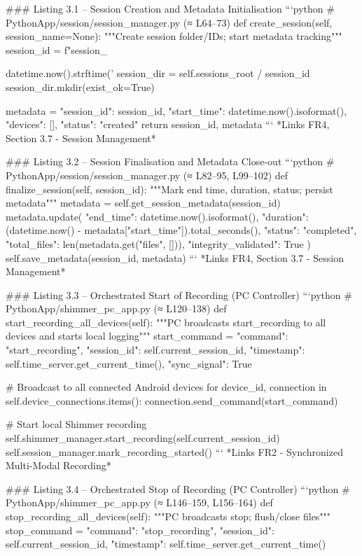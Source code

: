 \documentclass[12pt,a4paper]{article}
\begin{document}
### Listing 3.1 – Session Creation and Metadata Initialisation
```python
# PythonApp/session/session_manager.py (≈ L64–73)
def create_session(self, session_name=None):
    """Create session folder/IDs; start metadata tracking"""
    session_id = f"session_{datetime.now().strftime('%
    session_dir = self.sessions_root / session_id
    session_dir.mkdir(exist_ok=True)
    
    metadata = {
        "session_id": session_id,
        "start_time": datetime.now().isoformat(),
        "devices": [],
        "status": "created"
    }
    return session_id, metadata
```
*Links FR4, Section 3.7 - Session Management*

### Listing 3.2 – Session Finalisation and Metadata Close-out
```python
# PythonApp/session/session_manager.py (≈ L82–95, L99–102)
def finalize_session(self, session_id):
    """Mark end time, duration, status; persist metadata"""
    metadata = self.get_session_metadata(session_id)
    metadata.update({
        "end_time": datetime.now().isoformat(),
        "duration": (datetime.now() - metadata["start_time"]).total_seconds(),
        "status": "completed",
        "total_files": len(metadata.get("files", [])),
        "integrity_validated": True
    })
    self.save_metadata(session_id, metadata)
```
*Links FR4, Section 3.7 - Session Management*

### Listing 3.3 – Orchestrated Start of Recording (PC Controller)
```python
# PythonApp/shimmer_pc_app.py (≈ L120–138)
def start_recording_all_devices(self):
    """PC broadcasts start_recording to all devices and starts local logging"""
    start_command = {
        "command": "start_recording",
        "session_id": self.current_session_id,
        "timestamp": self.time_server.get_current_time(),
        "sync_signal": True
    }
    
    # Broadcast to all connected Android devices
    for device_id, connection in self.device_connections.items():
        connection.send_command(start_command)
    
    # Start local Shimmer recording
    self.shimmer_manager.start_recording(self.current_session_id)
    self.session_manager.mark_recording_started()
```
*Links FR2 - Synchronized Multi-Modal Recording*

### Listing 3.4 – Orchestrated Stop of Recording (PC Controller)
```python
# PythonApp/shimmer_pc_app.py (≈ L146–159, L156–164)
def stop_recording_all_devices(self):
    """PC broadcasts stop; flush/close files"""
    stop_command = {
        "command": "stop_recording",
        "session_id": self.current_session_id,
        "timestamp": self.time_server.get_current_time()
    }
    
}
\end{document}
